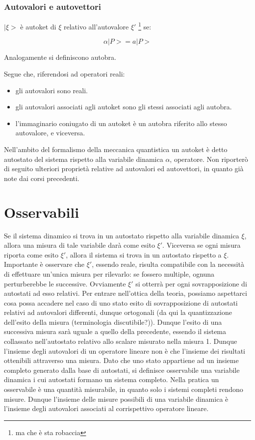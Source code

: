 \documentclass{article}
\begin{document}
\subsubsection{Autovalori e autovettori}

$|\xi>$ è autoket di $\xi$ relativo all'autovalore $\xi'$ \footnote{
    ma che è sta robaccia
} se:

\begin{equation}
    \alpha |P>= a |P>
\end{equation}

Analogamente si definiscono autobra.

Segue che, riferendosi ad operatori reali:
\begin{itemize}
    \item gli autovalori sono reali.
    \item gli autovalori associati agli autoket sono gli stessi associati agli autobra.
    \item l'immaginario coniugato di un autoket è un autobra riferito allo stesso autovalore, e viceversa.
\end{itemize}

Nell'ambito del formalismo della meccanica quantistica un autoket è detto autostato del sistema rispetto alla variabile dinamica $\alpha$, operatore.
Non riporterò di seguito ulteriori proprietà relative ad autovalori ed autovettori, in quanto già note dai corsi precedenti.

\section{Osservabili}
Se il sistema dinamico si trova in un autostato rispetto alla variabile dinamica $\xi$, allora una misura di tale variabile darà come esito
$\xi'$. Viceversa se ogni misura riporta come esito $\xi'$, allora il sistema si trova in un autostato rispetto a $\xi$.
Importante è osservare che $\xi'$, essendo reale, risulta compatibile con la necessità di effettuare un'unica misura per rilevarlo:
se fossero multiple, ognuna perturberebbe le successive.
Ovviamente $\xi'$ si otterrà per ogni sovrapposizione di autostati ad esso relativi.
Per entrare nell'ottica della teoria, possiamo aspettarci cosa possa accadere nel caso di uno stato esito di sovrapposizione di autostati relativi ad autovalori differenti,
dunque ortogonali (da qui la quantizzazione dell'esito della misura (terminologia discutibile?)).
Dunque l'esito di una successiva misura sarà uguale a quello della precedente, essendo il sistema collassato nell'autostato relativo allo scalare misurato nella misura 1.
Dunque l'insieme degli autovalori di un operatore lineare non è che l'insieme dei risultati ottenibili attraverso una misura.
Dato che uno stato appartiene ad un insieme completo generato dalla base di autostati, si definisce osservabile una variabile dinamica i cui autostati formano un sistema completo.
Nella pratica un osservabile è una quantità misurabile, in quanto solo i sistemi completi rendono misure.
Dunque l'insieme delle misure possibili di una variabile dinamica è l'insieme degli autovalori associati al corrispettivo operatore lineare.
\end{document}
